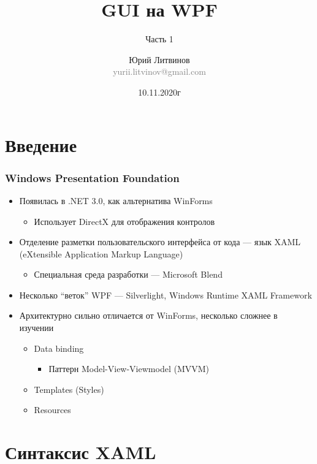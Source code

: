 \documentclass[xetex,mathserif,serif]{beamer}
\title{GUI на WPF}
\subtitle{Часть 1}
\author[Юрий Литвинов]{Юрий Литвинов\\\small{\textcolor{gray}{yurii.litvinov@gmail.com}}}
\date{10.11.2020г}
\begin{document}
    \frame{\titlepage}

    \section{Введение}

    \begin{frame}
        \frametitle{Windows Presentation Foundation}
        \begin{itemize}
            \item Появилась в .NET 3.0, как альтернатива WinForms
            \begin{itemize}
                \item Использует DirectX для отображения контролов
            \end{itemize}
            \item Отделение разметки пользовательского интерфейса от кода --- язык XAML (eXtensible Application Markup Language)
            \begin{itemize}
                \item Специальная среда разработки --- Microsoft Blend
            \end{itemize}
            \item Несколько ``веток'' WPF --- Silverlight, Windows Runtime XAML Framework
            \item Архитектурно сильно отличается от WinForms, несколько сложнее в изучении
            \begin{itemize}
                \item Data binding
                \begin{itemize}
                    \item Паттерн Model-View-Viewmodel (MVVM)
                \end{itemize}
                \item Templates (Styles)
                \item Resources
            \end{itemize}
        \end{itemize}
    \end{frame}

    \section{Синтаксис XAML}
\end{document}
